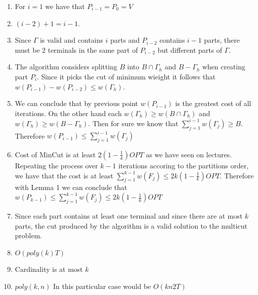 \documentclass[12pt, a4paper]{article}
\begin{document}
\begin{enumerate}
  \item For $i = 1$ we have that $P_{i-1} = P_0 = V$
  \item $(i-2) + 1 = i - 1$. 
  \item Since $\Gamma$ is valid and contains $i$ parts and $P_{i-2}$ contains $i - 1$ parts, there must be 2 terminals in the same part of $P_{i-2}$ but different parts of $\Gamma$.
  \item The algorithm considers splitting $B$ into $B \cap \Gamma_h$ and $B - \Gamma_h$ when creating part $P_i$. Since it picks the cut of minimum wieight it follows that $w(P_{i-1}) - w(P_{i-2}) \leq w(\Gamma_h)$.
  \item We can conclude that by previous point $w(P_{i-1})$ is the greatest cost of all iterations. On the other hand each $w(\Gamma_h) \geq w(B \cap \Gamma_h)$ and $w(\Gamma_h) \geq w(B - \Gamma_h)$. Then for sure we know that $\sum_{j=1}^{i-1} w(\Gamma_j) \geq B$. Therefore $w(P_{i-1}) \leq \sum_{j=1}^{i-1} w(\Gamma_j)$
  \item Cost of MinCut is at least $2(1-\frac{1}{k})OPT$ as we have seen on lectures.\newline
  Repeating the process over $k-1$ iterations accoring to the partitions order, we have that the cost is at least $\sum_{j=1}^{k-1} w(F_j) \leq 2k(1-\frac{1}{k})OPT$. Therefore with Lemma 1 we can conclude that $w(P_{k-1}) \leq \sum_{j=1}^{k-1} w(F_j) \leq 2k(1-\frac{1}{k})OPT$
  \item Since each part contains at least one terminal and since there are at most $k$ parts, the cut produced by the algorithm is a valid solution to the multicut problem.
  \item $O(poly(k)T)$ 
  \item Cardinality is at most $k$
  \item $poly(k,n)$ In this particular case would be $O(kn2T)$
\end{enumerate}
\end{document}
